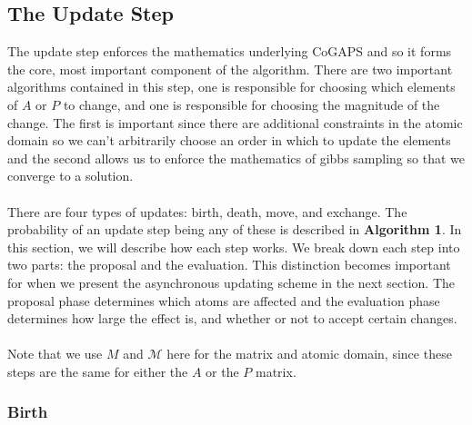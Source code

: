 \documentclass[]{article}
\begin{document}
\newpage


\subsection{The Update Step}

The update step enforces the mathematics underlying CoGAPS and so it forms the core, most important component of the algorithm. There are two important algorithms contained in this step, one is responsible for choosing which elements of $A$ or $P$ to change, and one is responsible for choosing the magnitude of the change. The first is important since there are additional constraints in the atomic domain so we can't arbitrarily choose an order in which to update the elements and the second allows us to enforce the mathematics of gibbs sampling so that we converge to a solution.\\
\\
There are four types of updates: birth, death, move, and exchange. The probability of an update step being any of these is described in \textbf{Algorithm 1}. In this section, we will describe how each step works. We break down each step into two parts: the proposal and the evaluation. This distinction becomes important for when we present the asynchronous updating scheme in the next section. The proposal phase determines which atoms are affected and the evaluation phase determines how large the effect is, and whether or not to accept certain changes.\\
\\
Note that we use $M$ and $\mathcal{M}$ here for the matrix and atomic domain, since these steps are the same for either the $A$ or the $P$ matrix.

\subsubsection{Birth}
\end{document}
